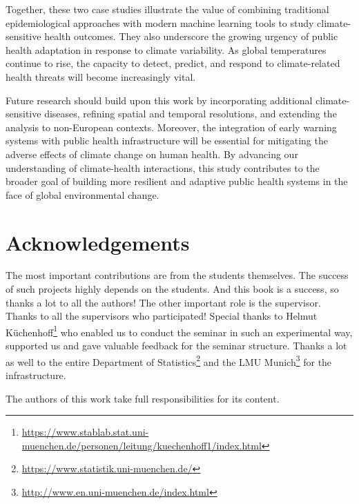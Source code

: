 \documentclass[
]{krantz}
\renewcommand{\href}[2]{#2\footnote{\url{#1}}}
\begin{document}
Together, these two case studies illustrate the value of combining traditional epidemiological approaches with modern machine learning tools to study climate-sensitive health outcomes. They also underscore the growing urgency of public health adaptation in response to climate variability. As global temperatures continue to rise, the capacity to detect, predict, and respond to climate-related health threats will become increasingly vital.

Future research should build upon this work by incorporating additional climate-sensitive diseases, refining spatial and temporal resolutions, and extending the analysis to non-European contexts. Moreover, the integration of early warning systems with public health infrastructure will be essential for mitigating the adverse effects of climate change on human health. By advancing our understanding of climate-health interactions, this study contributes to the broader goal of building more resilient and adaptive public health systems in the face of global environmental change.

\chapter{Acknowledgements}\label{acknowledgements}

The most important contributions are from the students themselves.
The success of such projects highly depends on the students.
And this book is a success, so thanks a lot to all the authors!
The other important role is the supervisor.
Thanks to all the supervisors who participated!
Special thanks to \href{https://www.stablab.stat.uni-muenchen.de/personen/leitung/kuechenhoff1/index.html}{Helmut Küchenhoff} who enabled us to conduct the seminar in such an experimental way, supported us and gave valuable feedback for the seminar structure.
Thanks a lot as well to the entire \href{https://www.statistik.uni-muenchen.de/}{Department of Statistics} and the \href{http://www.en.uni-muenchen.de/index.html}{LMU Munich} for the infrastructure.

The authors of this work take full responsibilities for its content.

  

\backmatter
\printindex
\end{document}

